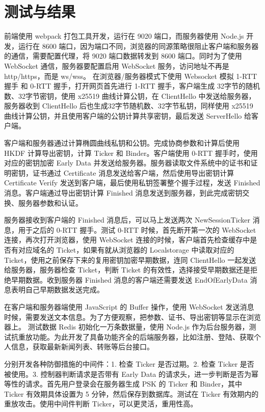 \section{测试与结果}

前端使用 webpack 打包工具开发，运行在 9020 端口，而服务器使用 Node.js 开发，运行在 8600 端口，因为端口不同，浏览器的同源策略很阻止客户端和服务器的通信，需要配置代理，将 9020 端口数据转发到 8600 端口。同时为了使用 WebSocket 通信，服务器要配置启用 WebSocket 服务，访问地址不再是 http/https，而是 ws/wss。
在浏览器/服务器模式下使用 Websocket 模拟 1-RTT 握手 和 0-RTT 握手，打开网页首先进行 1-RTT 握手，客户端生成 32字节的随机数、32字节密钥，使用 x25519 曲线计算公钥，在 ClientHello 中发送给服务器，服务器收到 ClientHello 后也生成32字节随机数、32字节私钥，同样使用 x25519 曲线计算公钥，并且使用客户端的公钥计算共享密钥，最后发送 ServerHello 给客户端。

客户端和服务器通过计算椭圆曲线私钥和公钥。完成协商参数和计算后使用 HKDF 计算导出密钥，计算 Ticker 和 Binder。客户端使用 0-RTT 握手时，使用对应的密钥加密 Early Data 并发送给服务器。服务器读取文件系统中的证书和证明密钥，证书通过 Certificate 消息发送给客户端，然后使用导出密钥计算 Certificate Verify 发送到客户端，最后使用私钥签署整个握手过程，发送 Finished 消息。客户端通过导出密钥计算 Finished 消息发送到服务器，到此完成密钥交换、服务器参数和认证。

服务器接收到客户端的 Finished 消息后，可以马上发送两次 NewSessionTicker 消息，用于之后的 0-RTT 握手。测试 0-RTT 时候，首先断开第一次的 WebSocket 连接，再次打开浏览器，使用 WebSocket 连接的时候，客户端首先检查缓存中是否有对应域名的 Ticket，如果有就从浏览器的 Localstorage 中读取对应的 Ticket，使用之前保存下来的复用密钥加密早期数据，连同 ClientHello 一起发送给服务器，服务器检查 Ticket，判断 Ticket 的有效性，选择接受早期数据还是拒绝早期数据。收到服务器 Finished 消息的客户端还需要发送 EndOfEarlyData 消息表明自己早期数据发送完成。

在客户端和服务器端使用 JavaScript 的 Buffer 操作，使用 WebSocket 发送消息时候，需要发送文本信息。为了方便观察，把参数、证书、导出密钥等显示在浏览器上。 测试数据 Redis 初始化一万条数据量，使用 Node.js 作为后台服务器，测试抗重放功能。为此开发了具备功能齐全的后端服务器，比如注册、登陆、获取个人信息，获取最新新闻列表、转账等后台接口。

分别开发各种防御措施的中间件：1. 检查 Ticker 是否过期。2. 检查 Ticker 是否被使用。3. 控制器判断请求是否带有 Early Data 的请求头，进一步判断是否为幂等性的请求。首先用户登录会在服务器生成 PSK 的 Ticker 和 Binder，其中 Ticker 有效期具体设置为 5 分钟，然后保存到数据库。测试在 Ticker 有效期内的重放攻击。使用中间件判断 Ticker，可以更灵活，重用性高。

